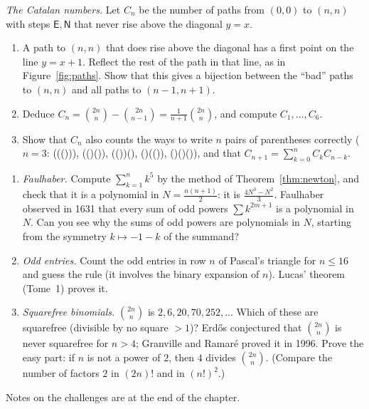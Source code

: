 \begin{exercise}[$\star\star\star$]\label{ex:catalan}
\emph{The Catalan numbers.} Let $C_n$ be the number of paths from $(0,0)$ to $(n,n)$ with steps $\mathsf E,\mathsf N$ that never rise above the diagonal $y=x$.
\begin{enumerate}[label=(\alph*)]
\item A path to $(n,n)$ that does rise above the diagonal has a first point on the line $y=x+1$. Reflect the rest of the path in that line, as in Figure~\ref{fig:paths}. Show that this gives a bijection between the ``bad'' paths to $(n,n)$ and all paths to $(n-1,n+1)$.
\item Deduce $C_n=\binom{2n}n-\binom{2n}{n-1}=\frac1{n+1}\binom{2n}n$, and compute $C_1,\dots,C_6$.
\item Show that $C_n$ also counts the ways to write $n$ pairs of parentheses correctly ($n=3$: ((())), (()()), (())(), ()(()), ()()()), and that $C_{n+1}=\sum_{k=0}^nC_kC_{n-k}$.
\end{enumerate}
\end{exercise}

\begin{challenge}
\begin{enumerate}[label=(\arabic*)]
\item \emph{Faulhaber.} Compute $\sum_{k=1}^nk^5$ by the method of Theorem~\ref{thm:newton}, and check that it is a polynomial in $N=\frac{n(n+1)}2$: it is $\frac{4N^3-N^2}3$.
Faulhaber observed in 1631 that every sum of odd powers $\sum k^{2m+1}$ is a polynomial in $N$. Can you see why the sums of odd powers are polynomials in $N$, starting from the symmetry $k\mapsto -1-k$ of the summand?
\item \emph{Odd entries.} Count the odd entries in row $n$ of Pascal's triangle for $n\le16$ and guess the rule (it involves the binary expansion of $n$). Lucas' theorem (Tome~1) proves it.
\item \emph{Squarefree binomials.} $\binom{2n}n$ is $2,6,20,70,252,\dots$ Which of these are squarefree (divisible by no square $>1$)? Erd\H{o}s conjectured that $\binom{2n}n$ is never squarefree for $n>4$; Granville and Ramar\'e proved it in 1996. Prove the easy part: if $n$ is not a power of $2$, then $4$ divides $\binom{2n}n$. (Compare the number of factors $2$ in $(2n)!$ and in $(n!)^2$.)
\end{enumerate}
Notes on the challenges are at the end of the chapter.
\end{challenge}

